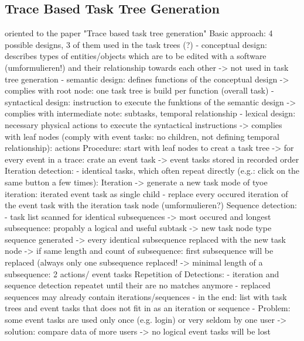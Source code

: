 \subsection{Trace Based Task Tree Generation}
oriented to the paper "Trace based task tree generation"
Basic approach: 4 possible designs, 3 of them used in the task trees (?)
- conceptual design: describes types of entities/objects which are to be edited with a software (umformulieren!) and their relationship towards each other
-> not used in task tree generation
- semantic design: defines functions of the conceptual design
-> complies with root node: one task tree is build per function (overall task)
- syntactical design: instruction to execute the funktions of the semantic design
-> complies with intermediate note: subtasks, temporal relationship
- lexical design: necessary physical actions to execute the syntactical instructions
-> complies with leaf nodes (comply with event tasks: no children, not defining temporal relationship): actions
Procedure: start with leaf nodes to creat a task tree
-> for every event in a trace: crate an event task
-> event tasks stored in recorded order
Iteration detection:
- identical tasks, which often repeat directly (e.g.: click on the same button a few times): Iteration
-> generate a new task mode of tyoe iteration: iterated event task as single child
- replace every occured iteration of the event task with the iteration task node (umformulieren?)
Sequence detection:
- task list scanned for identical subsequences
-> most occured and longest subsequence: propably a logical and useful subtask
-> new task node type sequence generated
-> every identical subsequence replaced with the new task node
-> if same length and count of subsequence: first subsequence will be replaced (always only one subsequence replaced!
-> minimal length of a subsequence: 2 actions/ event tasks
Repetition of Detections:
- iteration and sequence detection repeatet until their are no matches anymore
- replaced sequences may already contain iterations/sequences
- in the end: list with task trees and event tasks that does not fit in as an iteration or sequence
- Problem: some event tasks are used only once (e.g. login) or very seldom by one user
-> solution: compare data of more users -> no logical event tasks will be lost
